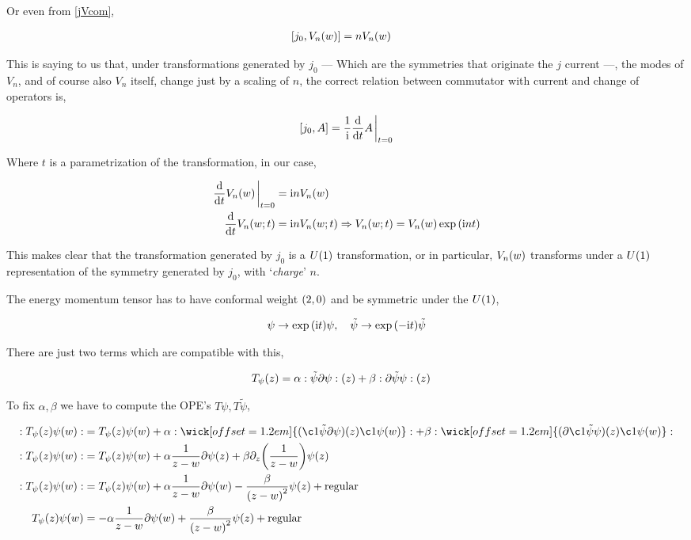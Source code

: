 Or even from \ref{jVcom},

\begin{align*}
    \comm{j_0}{V_n\qty(w)}&=nV_n\qty(w)
\end{align*}

This is saying to us that, under transformations generated by $j_0$ --- Which are the symmetries that originate the $j$ current ---, the modes of $V_n$, 
and of course also $V_n$ itself, change just by a scaling of $n$, the correct relation between commutator with current and change of operators is,

\begin{align*}
    \comm{j_0}{A}=\frac{1}{\im }\dv{}{t} A\eval_{t=0}
\end{align*}

Where $t$ is a parametrization of the transformation, in our case,

\begin{align*}
    \dv{}{t}V_n\qty(w)\eval_{t=0}&=\im nV_n\qty(w)\\
    \dv{}{t}V_n\qty(w;t)&=\im nV_n\qty(w;t)\Rightarrow V_n\qty(w;t)=V_n\qty(w)\exp\qty(\im n t)
\end{align*}

This makes clear that the transformation generated by $j_0$ is a $U\qty(1)$ transformation, or in particular, 
$V_n\qty(w)$ transforms under a $U\qty(1)$ representation of the symmetry generated by $j_0$, with `\textit{charge}' $n$.

\probitem{}

The energy momentum tensor has to have conformal weight $\qty(2,0)$ and be symmetric under the $U\qty(1)$, 

\begin{align*}
    \psi\rightarrow \exp\qty(\im t)\psi,\ \ \ \tilde\psi\rightarrow\exp\qty(-\im t)\tilde\psi
\end{align*}

There are just two terms which are compatible with this,

\begin{align*}
    T_\psi\qty(z)&=\alpha:\tilde\psi\partial\psi:\qty(z)+\beta:\partial\tilde\psi\psi:\qty(z)
\end{align*}

To fix $\alpha,\beta$ we have to compute the OPE's $T\psi,T\tilde\psi$,

\begin{align*}
    \cnord{T_\psi\qty(z)\psi\qty(w)}&=T_\psi\qty(z)\psi\qty(w)+\alpha\cnord{\wick[offset=1.2em]{(\c1{\tilde\psi}\partial\psi)\qty(z)\c1\psi\qty(w)}}+\beta\cnord{\wick[offset=1.2em]{(\partial\c1{\tilde\psi}\psi)\qty(z)\c1\psi\qty(w)}}\\
    \cnord{T_\psi\qty(z)\psi\qty(w)}&=T_\psi\qty(z)\psi\qty(w)+\alpha\frac{1}{z-w}\partial\psi\qty(z)+\beta\partial_z\qty(\frac{1}{z-w})\psi\qty(z)\\
    \cnord{T_\psi\qty(z)\psi\qty(w)}&=T_\psi\qty(z)\psi\qty(w)+\alpha\frac{1}{z-w}\partial\psi\qty(w)-\frac{\beta}{\qty(z-w)^2}\psi\qty(z)+\textnormal{regular}\\
    T_\psi\qty(z)\psi\qty(w)&=-\alpha\frac{1}{z-w}\partial\psi\qty(w)+\frac{\beta}{\qty(z-w)^2}\psi\qty(z)+\textnormal{regular}
\end{align*}

